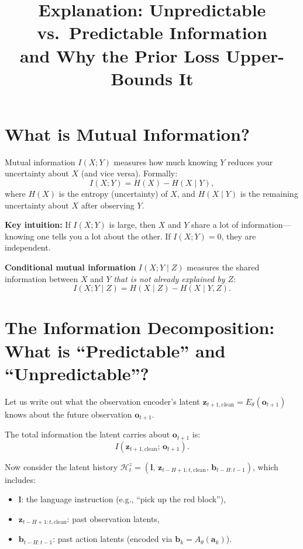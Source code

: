 \documentclass{article}
\title{Explanation: Unpredictable vs.\ Predictable Information\\and Why the Prior Loss Upper-Bounds It}
\author{}
\date{}
\newcommand{\vo}{\bm{o}}
\newcommand{\vz}{\bm{z}}
\newcommand{\va}{\bm{a}}
\newcommand{\vb}{\bm{b}}
\begin{document}
\maketitle

\section{What is Mutual Information?}

Mutual information $I(X; Y)$ measures how much knowing $Y$ reduces your uncertainty about $X$ (and vice versa). Formally:
\begin{equation}
  I(X; Y) = H(X) - H(X \mid Y),
\end{equation}
where $H(X)$ is the entropy (uncertainty) of $X$, and $H(X \mid Y)$ is the remaining uncertainty about $X$ after observing $Y$.

\textbf{Key intuition:} If $I(X; Y)$ is large, then $X$ and $Y$ share a lot of information---knowing one tells you a lot about the other. If $I(X; Y) = 0$, they are independent.

\textbf{Conditional mutual information} $I(X; Y \mid Z)$ measures the shared information between $X$ and $Y$ \emph{that is not already explained by $Z$}:
\begin{equation}
  I(X; Y \mid Z) = H(X \mid Z) - H(X \mid Y, Z).
\end{equation}

\section{The Information Decomposition: What is ``Predictable'' and ``Unpredictable''?}

Let us write out what the observation encoder's latent $\vz_{t+1,\text{clean}} = E_\theta(\vo_{t+1})$ knows about the future observation $\vo_{t+1}$.

The total information the latent carries about $\vo_{t+1}$ is:
\begin{equation}
  I(\vz_{t+1,\text{clean}};\, \vo_{t+1}).
\end{equation}

Now consider the latent history $\mathcal{H}_t^z = (\bm{l},\, \vz_{t-H+1:t,\text{clean}},\, \vb_{t-H:t-1})$, which includes:
\begin{itemize}[leftmargin=*]
  \item $\bm{l}$: the language instruction (e.g., ``pick up the red block''),
  \item $\vz_{t-H+1:t,\text{clean}}$: past observation latents,
  \item $\vb_{t-H:t-1}$: past action latents (encoded via $\vb_k = A_\theta(\va_k)$).
\end{itemize}
\end{document}
